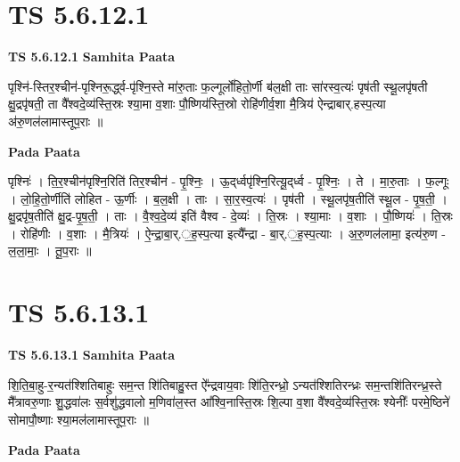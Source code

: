 \documentclass[17pt]{extarticle}
\begin{document}
\section*{ TS 5.6.12.1 }

\textbf{TS 5.6.12.1 } \newline
\textbf{Samhita Paata} \newline

पृश्नि॑-स्तिर॒श्चीन॑-पृश्निरू॒र्द्ध्व-पृ॑श्नि॒स्ते मा॑रु॒ताः फ॒ल्गूर्लो॑हितो॒र्णी ब॑ल॒क्षी ताः सा॑रस्व॒त्यः॑ पृष॑ती स्थू॒लपृ॑षती क्षु॒द्रपृ॑षती॒ ता वै᳚श्वदे॒व्य॑स्ति॒स्रः श्या॒मा व॒शाः पौ॒ष्णिय॑स्ति॒स्रो रोहि॑णीर्व॒शा मै॒त्रिय॑ ऐन्द्राबार्.हस्प॒त्या अ॑रु॒णल॑लामास्तूप॒राः ॥ \newline

\textbf{Pada Paata} \newline

पृश्निः॑ । ति॒र॒श्चीन॑पृश्नि॒रिति॑ तिर॒श्चीन॑ - पृ॒श्निः॒ । ऊ॒द्‌र्ध्वपृ॑श्नि॒रित्यू॒द्‌र्ध्व - पृ॒श्निः॒ । ते । मा॒रु॒ताः । फ॒ल्गूः । लो॒हि॒तो॒र्णीति॑ लोहित - ऊ॒र्णीः । ब॒ल॒क्षी । ताः । सा॒र॒स्व॒त्यः॑ । पृष॑ती । स्थू॒लपृ॑ष॒तीति॑ स्थू॒ल - पृ॒ष॒ती॒ । क्षु॒द्रपृ॑ष॒तीति॑ क्षु॒द्र-पृ॒ष॒ती॒ । ताः । वै॒श्व॒दे॒व्य॑ इति॑ वैश्व - दे॒व्यः॑ । ति॒स्रः । श्या॒माः । व॒शाः । पौ॒ष्णियः॑ । ति॒स्रः । रोहि॑णीः । व॒शाः । मै॒त्रियः॑ । ऐ॒न्द्रा॒बा॒र्.॒ह॒स्प॒त्या इत्यै᳚न्द्रा - बा॒र्.॒ह॒स्प॒त्याः । अ॒रु॒णल॑लामा॒ इत्य॑रु॒ण - ल॒ला॒माः॒ । तू॒प॒राः ॥  \newline




\section*{ TS 5.6.13.1 }

\textbf{TS 5.6.13.1 } \newline
\textbf{Samhita Paata} \newline

शि॒ति॒बा॒हु-र॒न्यत॑श्शितिबाहुः सम॒न्त शि॑तिबाहु॒स्त ऐ᳚न्द्रवाय॒वाः शि॑ति॒रन्ध्रो॒ ऽन्यत॑श्शितिरन्ध्रः सम॒न्तशि॑तिरन्ध्र॒स्ते मै᳚त्रावरु॒णाः शु॒द्धवा॑लः स॒र्वशु॑द्धवालो म॒णिवा॑ल॒स्त आ᳚श्वि॒नास्ति॒स्रः शि॒ल्पा व॒शा वै᳚श्वदे॒व्य॑स्ति॒स्रः श्येनीः᳚ परमे॒ष्ठिने॑ सोमापौ॒ष्णाः श्या॒मल॑लामास्तूप॒राः ॥ \newline

\textbf{Pada Paata} \newline
\end{document}
